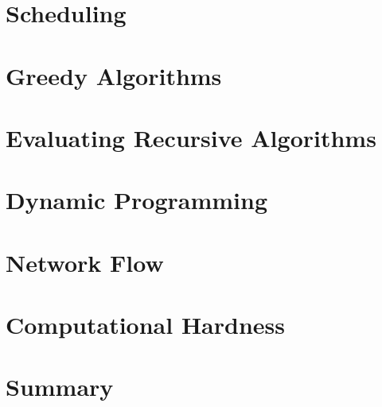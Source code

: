 \documentclass{memoir}
\begin{document}
\chapter{Scheduling}




\chapter{Greedy Algorithms}



\chapter{Evaluating Recursive Algorithms}



\chapter {Dynamic Programming}



\chapter{Network Flow}


\chapter{Computational Hardness}


\chapter{Summary}


 
 
\end{document}
